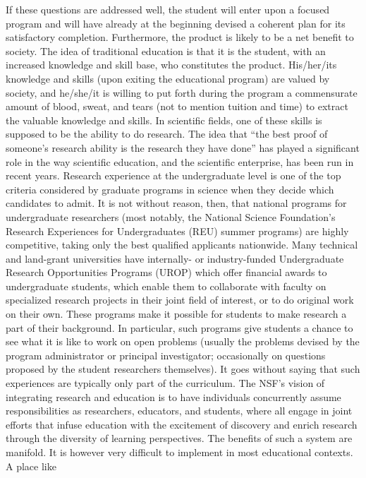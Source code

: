 If these questions are addressed well, the student will enter upon a
focused program and will have already at the beginning devised a
coherent plan for its satisfactory completion. Furthermore, the product
is likely to be a net benefit to society. The idea of traditional
education is that it is the student, with an increased knowledge and
skill base, who constitutes the product. His/her/its knowledge and
skills (upon exiting the educational program) are valued by society, and
he/she/it is willing to put forth during the program a commensurate
amount of blood, sweat, and tears (not to mention tuition and time) to
extract the valuable knowledge and skills. In scientific fields, one of
these skills is supposed to be the ability to do research. The idea that
``the best proof of someone's research ability is the research they have
done'' has played a significant role in the way scientific education,
and the scientific enterprise, has been run in recent years. Research
experience at the undergraduate level is one of the top criteria
considered by graduate programs in science when they decide which
candidates to admit. It is not without reason, then, that national
programs for undergraduate researchers (most notably, the National
Science Foundation's Research Experiences for Undergraduates (REU)
summer programs) are highly competitive, taking only the best qualified
applicants nationwide. Many technical and land-grant universities have
internally- or industry-funded Undergraduate Research Opportunities
Programs (UROP) which offer financial awards to undergraduate students,
which enable them to collaborate with faculty on specialized research
projects in their joint field of interest, or to do original work on
their own. These programs make it possible for students to make research
a part of their background. In particular, such programs give students a
chance to see what it is like to work on open problems (usually the
problems devised by the program administrator or principal investigator;
occasionally on questions proposed by the student researchers
themselves). It goes without saying that such experiences are typically
only part of the curriculum. The NSF's vision of integrating research
and education is to have individuals concurrently assume
responsibilities as researchers, educators, and students, where all
engage in joint efforts that infuse education with the excitement of
discovery and enrich research through the diversity of learning
perspectives. The benefits of such a system are manifold. It is however
very difficult to implement in most educational contexts. A place like
